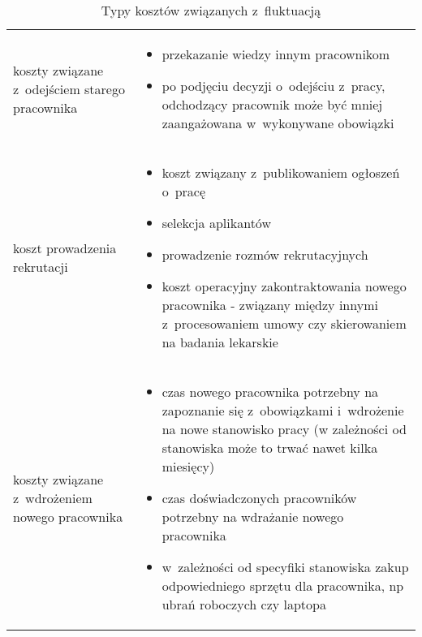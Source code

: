 \noindent\begin{minipage}{\textwidth}
             \begin{table}[H]
                 \raggedright\caption{Typy kosztów związanych z~fluktuacją\label{tabela:fluktuacja-koszty}}
                 \begin{center}
                     \begin{tabular}{|P{.15\textwidth}|P{.75\textwidth}|}

                         \hline
                          &
                          \\
                         \hline

                         koszty związane z~odejściem starego pracownika &
                         \begin{itemize}
                             \item przekazanie wiedzy innym pracownikom
                             \item po podjęciu decyzji o~odejściu z~pracy, odchodzący pracownik może być mniej zaangażowana w~wykonywane obowiązki
                         \end{itemize} \\

                         \hline

                         koszt prowadzenia rekrutacji &
                         \begin{itemize}
                             \item koszt związany z~publikowaniem ogłoszeń o~pracę
                             \item selekcja aplikantów
                             \item prowadzenie rozmów rekrutacyjnych
                             \item koszt operacyjny zakontraktowania nowego pracownika - związany między innymi z~procesowaniem umowy czy skierowaniem na badania lekarskie
                         \end{itemize} \\
                         \hline

                         koszty związane z~wdrożeniem nowego pracownika &
                         \begin{itemize}
                             \item czas nowego pracownika potrzebny na zapoznanie się z~obowiązkami i~wdrożenie na nowe stanowisko pracy (w zależności od stanowiska może to trwać nawet kilka miesięcy)
                             \item czas doświadczonych pracowników potrzebny na wdrażanie nowego pracownika
                             \item w~zależności od specyfiki stanowiska zakup odpowiedniego sprzętu dla pracownika, np ubrań roboczych czy laptopa
                         \end{itemize} \\
                         \hline


\end{tabular}
\end{center}
\end{table}
\end{minipage}
